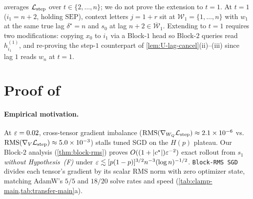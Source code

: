 \begin{remark}[Inclusion of $t = 1$]
\label{rem:first-state}
\label{rem:joint-scope}
\label{rem:J-balance}
 averages $\mathcal L_{\mathrm{step}}$ over $t \in \{2,\ldots,n\}$; we do not prove the extension to $t = 1$. At $t = 1$ ($i_1 = n+2$, holding $\mathrm{SEP}$), context letters $j = 1+r$ sit at $\mathcal W_1 = \{1,\ldots,n\}$ with $w_1$ at the same true lag $\delta^\star = n$ and $s_0$ at lag $n+2 \in \overline{\mathcal W}_1$. Extending to $t = 1$ requires two modifications: copying $x_0$ to $i_1$ via a Block-$1$ head so Block-$2$ queries read $h_{i_1}^{(1)}$, and re-proving the step-$1$ counterpart of \cref{lem:U-lag-cancel}(ii)--(iii) since lag $1$ reads $w_n$ at $t = 1$.
\end{remark}

\section{Proof of \texorpdfstring{}{Theorem 3}}
\label{app:adaptive}

\paragraph{Empirical motivation.}
At $\varepsilon = 0.02$, cross-tensor gradient imbalance ($\mathrm{RMS}(\nabla_{W_Q}\mathcal L_{\mathrm{step}}) \approx 2.1\times 10^{-6}$ vs.\ $\mathrm{RMS}(\nabla_V\mathcal L_{\mathrm{step}}) \approx 5.0\times 10^{-3}$) stalls tuned SGD on the $H(p)$ plateau. Our Block-$2$ analysis (\cref{thm:block-rms}) proves $O((1+|c^\star|)\varepsilon^{-2})$ exact rollout from $s_1$ \emph{without Hypothesis~(F)} under $\varepsilon \lesssim [p(1-p)]^{3/2}n^{-3}(\log n)^{-1/2}$. \texttt{Block-RMS SGD} divides each tensor's gradient by its scalar RMS norm with zero optimizer state, matching AdamW's $5/5$ and $18/20$ solve rates and speed (\cref{tab:clamp-main,tab:transfer-main}a).

